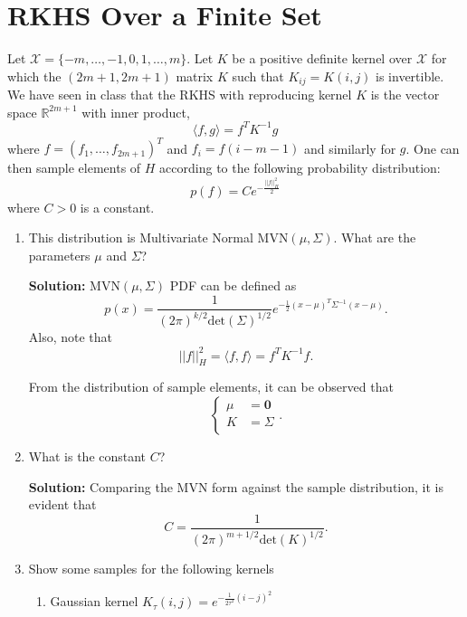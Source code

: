 \documentclass{article}[12pt]
\begin{document}
\section{RKHS Over a Finite Set}
Let $\mathcal{X} = \{-m,\ldots,-1,0,1,\ldots,m\}$. Let $K$ be a positive definite kernel over $\mathcal{X}$ for which the $(2m+1,2m+1)$ matrix $K$ such that $K_{ij}=K(i,j)$ is invertible. We have seen in class that the RKHS with reproducing kernel $K$ is the vector space $\mathbb{R}^{2m+1}$ with inner product, 
$$\langle f,g \rangle = f^T K^{-1}g $$
where $f=(f_1,\ldots,f_{2m+1})^T$ and $f_i=f(i-m-1)$ and similarly for $g$. 
One can then sample elements of $H$ according to the following probability distribution:  
$$p(f) = C e^{-\frac{||f||_H^2}{2}}$$
where $C>0$ is a constant. 
\begin{enumerate}
\item This distribution is Multivariate Normal MVN$(\mu,\Sigma)$. What are the parameters $\mu$ and $\Sigma$?

\textbf{Solution:} MVN$(\mu, \Sigma)$ PDF can be defined as 
	\begin{equation}
		p(x) = \frac{1}{(2\pi)^{k/2} \text{det}(\Sigma)^{1/2}} e^{- \frac{1}{2} (x-\mu)^T \Sigma^{-1} (x-\mu) }. 
	\end{equation}
Also, note that 
\begin{equation}
	|| f ||^2_{H} = \langle f, f \rangle = f^T K^{-1} f.
\end{equation}

From the distribution of sample elements, it can be observed that 
	\begin{equation}
		\begin{cases}
			\mu &= \mathbf 0 \\	
			K &= \Sigma \\
		\end{cases}.
	\end{equation}

\item What is the constant $C$?

\textbf{Solution:} Comparing the MVN form against the sample distribution, it is evident that 
	\begin{equation}
		C = \frac{1}{(2\pi)^{m+1/2} \text{det} (K)^{1/2}}. 
	\end{equation}
	
\item Show some samples for the following kernels
\begin{enumerate}
\item Gaussian kernel $K_\tau(i,j)=e^{-\frac{1}{2\tau^2}(i-j)^2}$


\end{enumerate}
\end{enumerate}
\end{document}
